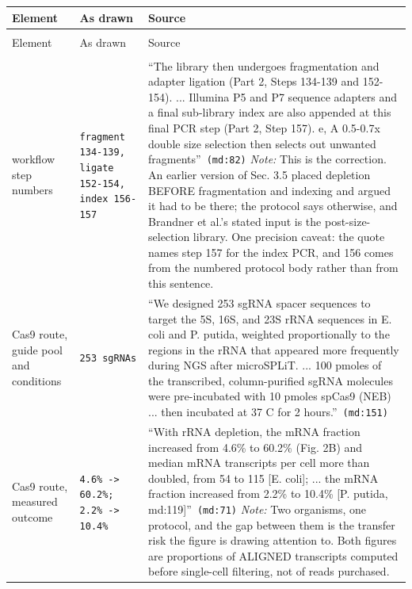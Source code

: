 \begin{longtable}{@{}>{\raggedright\arraybackslash}p{}@{\hspace{0.025\textwidth}}>{\raggedright\arraybackslash}p{}@{\hspace{0.025\textwidth}}>{\raggedright\arraybackslash}p{}@{}}
\toprule
Element & As drawn & Source \\
\midrule
\endfirsthead
\multicolumn{3}{@{}l}{\scriptsize\itshape Table~\ref{tab:prov-rrna-depletion-options}, continued}\\
\toprule
Element & As drawn & Source \\
\midrule
\endhead
\bottomrule
\endlastfoot
\multicolumn{3}{@{}l}{\bfseries rrna-depletion-options.drawio} \\*[1pt]
workflow step numbers & \texttt{fragment 134-139, ligate 152-154, index 156-157} & ``The library then undergoes fragmentation and adapter ligation (Part 2, Steps 134-139 and 152-154). ... Illumina P5 and P7 sequence adapters and a final sub-library index are also appended at this final PCR step (Part 2, Step 157). e, A 0.5-0.7x double size selection then selects out unwanted fragments'' \citep{gaisserHighthroughputSinglecellTranscriptomics2024}\,\texttt{(md:82)} {\color{tcgray}\emph{Note:} This is the correction. An earlier version of Sec. 3.5 placed depletion BEFORE fragmentation and indexing and argued it had to be there; the protocol says otherwise, and Brandner et al.'s stated input is the post-size-selection library. One precision caveat: the quote names step 157 for the index PCR, and 156 comes from the numbered protocol body rather than from this sentence.} \\
\addlinespace[2.5pt]
Cas9 route, guide pool and conditions & \texttt{253 sgRNAs} & ``We designed 253 sgRNA spacer sequences to target the 5S, 16S, and 23S rRNA sequences in E. coli and P. putida, weighted proportionally to the regions in the rRNA that appeared more frequently during NGS after microSPLiT. ... 100 pmoles of the transcribed, column-purified sgRNA molecules were pre-incubated with 10 pmoles spCas9 (NEB) ... then incubated at 37 C for 2 hours.'' \citep{brandnerPooledSinglecellCRISPRa2025}\,\texttt{(md:151)} \\
\addlinespace[2.5pt]
Cas9 route, measured outcome & \texttt{4.6\% -\textgreater{} 60.2\%; 2.2\% -\textgreater{} 10.4\%} & ``With rRNA depletion, the mRNA fraction increased from 4.6\% to 60.2\% (Fig. 2B) and median mRNA transcripts per cell more than doubled, from 54 to 115 [E. coli]; ... the mRNA fraction increased from 2.2\% to 10.4\% [P. putida, md:119]'' \citep{brandnerPooledSinglecellCRISPRa2025}\,\texttt{(md:71)} {\color{tcgray}\emph{Note:} Two organisms, one protocol, and the gap between them is the transfer risk the figure is drawing attention to. Both figures are proportions of ALIGNED transcripts computed before single-cell filtering, not of reads purchased.} \\

\end{longtable}
